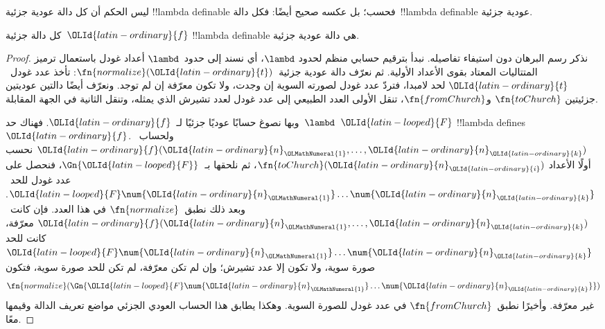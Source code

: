 \documentclass[../../../include/open-logic-section]{subfiles}
\begin{document}

ليس الحكم أن كل دالة عودية جزئية !!{lambda definable} فحسب؛ بل عكسه
صحيح أيضًا: فكل دالة~!!{lambda definable} عودية جزئية.

\begin{thm}
   كل دالة جزئية~$\OLId{latin-ordinary}{f}$
  !!{lambda definable} هي دالة عودية جزئية.
\end{thm}

\begin{proof}
  نذكر رسم البرهان دون استيفاء تفاصيله. نبدأ بترقيم حسابي منظم لحدود
  $\lambd$، أي نسند إلى حدود~$\lambd$ أعداد غودل باستعمال ترميز المتتاليات المعتاد
  بقوى الأعداد الأولية. ثم نعرّف دالة عودية جزئية~$\fn{normalize}(\OLId{latin-ordinary}{t})$:
  تأخذ عدد غودل~$\OLId{latin-ordinary}{t}$ لحد لامبدا، فتردّ عدد غودل لصورته السوية إن وجدت،
  ولا تكون معرّفة إن لم توجد. ونعرّف أيضًا دالتين عوديتين جزئيتين
  $\fn{toChurch}$ و$\fn{fromChurch}$، تنقل الأولى العدد الطبيعي إلى
  عدد غودل لعدد تشيرش الذي يمثله، وتنقل الثانية في الجهة المقابلة.

  وبها نصوغ حسابًا عوديًا جزئيًا لـ~$\OLId{latin-ordinary}{f}$. فهناك حد~$\lambd$~$\OLId{latin-looped}{F}$
  !!{lambda define}s~$\OLId{latin-ordinary}{f}$. ولحساب~$\OLId{latin-ordinary}{f}(\OLId{latin-ordinary}{n}_\OLMathNumeral{1}, \dots, \OLId{latin-ordinary}{n}_\OLId{latin-ordinary}{k})$ نحسب أولًا الأعداد
  $\fn{toChurch}(\OLId{latin-ordinary}{n}_\OLId{latin-ordinary}{i})$، ثم نلحقها بـ~$\Gn{\OLId{latin-looped}{F}}$، فنحصل على عدد غودل
  للحد~$\OLId{latin-looped}{F} \num{\OLId{latin-ordinary}{n}_\OLMathNumeral{1}}\dots\num{\OLId{latin-ordinary}{n}_\OLId{latin-ordinary}{k}}$. وبعد ذلك نطبق~$\fn{normalize}$
  في هذا العدد. فإن كانت~$\OLId{latin-ordinary}{f}(\OLId{latin-ordinary}{n}_\OLMathNumeral{1}, \dots, \OLId{latin-ordinary}{n}_\OLId{latin-ordinary}{k})$ معرّفة، كانت للحد
  $\OLId{latin-looped}{F} \num{\OLId{latin-ordinary}{n}_\OLMathNumeral{1}}\dots\num{\OLId{latin-ordinary}{n}_\OLId{latin-ordinary}{k}}$ صورة سوية، ولا تكون إلا عدد تشيرش؛
  وإن لم تكن معرّفة، لم تكن للحد صورة سوية، فتكون
  \[\fn{normalize}(\Gn{\OLId{latin-looped}{F}\num{\OLId{latin-ordinary}{n}_\OLMathNumeral{1}}\dots\num{\OLId{latin-ordinary}{n}_\OLId{latin-ordinary}{k}}})\]
  غير معرّفة. وأخيرًا نطبق~$\fn{fromChurch}$ في عدد غودل للصورة
  السوية. وهكذا يطابق هذا الحساب العودي الجزئي مواضع تعريف الدالة
  وقيمها معًا.
\end{proof}
\end{document}
